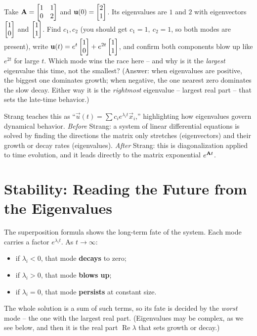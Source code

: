 \begin{labbox}
Take $\mathbf{A}=\begin{bmatrix}1&1\\0&2\end{bmatrix}$ and $\mathbf{u}(0)=\begin{bmatrix}2\\1\end{bmatrix}$.
Its eigenvalues are $1$ and $2$ with eigenvectors $\begin{bmatrix}1\\0\end{bmatrix}$ and
$\begin{bmatrix}1\\1\end{bmatrix}$. Find $c_1,c_2$ (you should get $c_1=1,\ c_2=1$, so both modes are
present), write $\mathbf{u}(t)=e^{t}\begin{bmatrix}1\\0\end{bmatrix}+e^{2t}\begin{bmatrix}1\\1\end{bmatrix}$, and
confirm both components blow up like $e^{2t}$ for large $t$. Which mode wins the
race here -- and why is it the \emph{largest} eigenvalue this time, not the
smallest? (Answer: when eigenvalues are positive, the biggest one dominates
growth; when negative, the one nearest zero dominates the slow decay. Either way
it is the \emph{rightmost} eigenvalue -- largest real part -- that sets the
late-time behavior.)
\end{labbox}

\begin{strangbox}
Strang teaches this as ``$\vec{u}(t) = \sum c_i e^{\lambda_i t}\vec{x}_i$,'' highlighting
how eigenvalues govern dynamical behavior. \emph{Before} Strang: a system of linear
differential equations is solved by finding the directions the matrix only stretches
(eigenvectors) and their growth or decay rates (eigenvalues). \emph{After} Strang:
this is diagonalization applied to time evolution, and it leads directly to the
matrix exponential $e^{\mathbf{A}t}$.
\end{strangbox}

\section{Stability: Reading the Future from the Eigenvalues}
\label{ch25:stability}

The superposition formula shows the long-term fate of the system.
Each mode carries a factor $e^{\lambda_i t}$. As $t\to\infty$:
\begin{itemize}
  \item if $\lambda_i < 0$, that mode \textbf{decays} to zero;
  \item if $\lambda_i > 0$, that mode \textbf{blows up};
  \item if $\lambda_i = 0$, that mode \textbf{persists} at constant size.
\end{itemize}
The whole solution is a sum of such terms, so its fate is decided by the
\emph{worst} mode -- the one with the largest real part. (Eigenvalues may be
complex, as we see below, and then it is the real part $\operatorname{Re}\lambda$
that sets growth or decay.)

